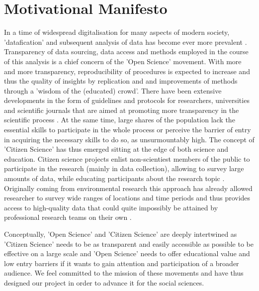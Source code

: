 \documentclass[preprint,12pt,authoryear]{elsarticle}
\begin{document}
\section{Motivational Manifesto}
In a time of widespread digitalisation for many aspects of modern society, 'datafication' and subsequent analysis of data has become ever more prevalent \cite{baack_datafication_2015, lycett_datafication:_2013}. Transparency of data sourcing, data access and methods employed in the course of this analysis is a chief concern of the 'Open Science' movement\cite{miguel_promoting_2014}. With more and more transparency, reproducibility of procedures is expected to increase and thus the quality of insights by replication and and improvements of methods through a 'wisdom of the (educated) crowd'. There have been extensive developments in the form of guidelines and protocols for researchers, universities and scientific journals that are aimed at promoting more transparency in the scientific process \cite{nosek_promoting_2015}. 
At the same time, large shares of the population lack the essential skills to participate in the whole process or perceive the barrier of entry in acquiring the necessary skills to do so, as unsurmountably high. The concept of 'Citizen Science' has thus emerged sitting at the edge of both science and education. Citizen science projects enlist non-scientiest members of the public to participate in the research (mainly in data collection), allowing to survey large amounts of data, while educating participants about the research topic \cite{shirk_public_2012}. Originally coming from environmental research this approach has already allowed researcher to survey wide ranges of locations and time periods and thus provides access to high-quality data that could quite impossibly be attained by professional research teams on their own \cite{bonney_citizen_2009}.

Conceptually, 'Open Science' and 'Citizen Science' are deeply intertwined as 'Citizen Science' needs to be as transparent and easily accessible as possible to be effective on a large scale and 'Open Science' needs to offer educational value and low entry barriers if it wants to gain attention and participation of a broader audience. We feel committed to the mission of these movements and have thus designed our project in order to advance it for the social sciences. 
\end{document}
